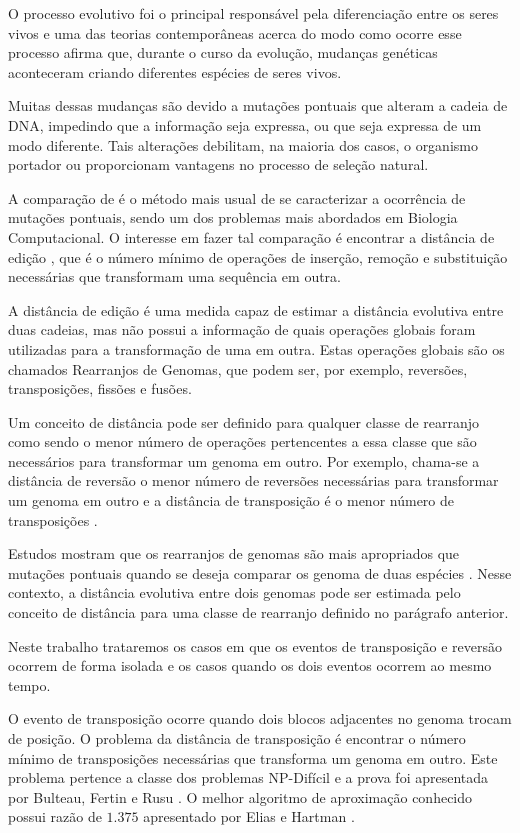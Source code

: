 O processo evolutivo foi o principal responsável pela diferenciação
entre os seres vivos e uma das teorias contemporâneas acerca do modo
como ocorre esse processo afirma que, durante o curso da evolução,
mudanças genéticas aconteceram criando diferentes espécies de
seres vivos.

Muitas dessas mudanças são devido a mutações pontuais que alteram a
cadeia de DNA, impedindo que a informação seja expressa, ou que seja
expressa de um modo diferente. Tais alterações debilitam, na maioria
dos casos, o organismo portador ou proporcionam vantagens no processo
de seleção natural.

A comparação de \seq{} é o método mais usual de se caracterizar a
ocorrência de mutações pontuais, sendo um dos problemas mais abordados
em Biologia Computacional. O interesse em fazer tal comparação é
encontrar a distância de edição \cite{SetubalMeidanis*1997}, que é o
número mínimo de operações de inserção, remoção e substituição
necessárias que transformam uma sequência em outra.

A distância de edição é uma medida capaz de estimar a distância
evolutiva entre duas cadeias, mas não possui a informação de quais
operações globais foram utilizadas para a transformação de uma
\seq{} em outra. Estas operações globais são os chamados
Rearranjos de Genomas, que podem ser, por exemplo, reversões,
transposições, fissões e fusões.

Um conceito de distância pode ser definido para qualquer classe de
rearranjo como sendo o menor número de operações pertencentes a essa
classe que são necessários para transformar um genoma em outro. Por
exemplo, chama-se a distância de reversão o menor número de reversões
necessárias para transformar um genoma em outro
\cite{BafnaPevzner*1996} e a distância de transposição é o menor
número de transposições \cite{BafnaPevzner*1998}.

Estudos mostram que os rearranjos de genomas são mais apropriados que
mutações pontuais quando se deseja comparar os genoma de duas espécies
\cite{PalmerHerbon*1988}. Nesse contexto, a distância evolutiva entre
dois genomas pode ser estimada pelo conceito de distância para uma
classe de rearranjo definido no parágrafo anterior.

Neste trabalho trataremos os casos em que os eventos de transposição e
reversão ocorrem de forma isolada e os casos quando os dois eventos
ocorrem ao mesmo tempo.

O evento de transposição ocorre quando dois blocos adjacentes no
genoma trocam de posição. O problema da distância de transposição é
encontrar o número mínimo de transposições necessárias que transforma
um genoma em outro. Este problema pertence a classe dos problemas
NP-Difícil e a prova foi apresentada por Bulteau, Fertin e
Rusu \cite{BulteauFertinRusu*2010}. O melhor algoritmo de aproximação
conhecido possui razão de $1.375$ apresentado por Elias e
Hartman \cite{EliasHartman*2006}.

